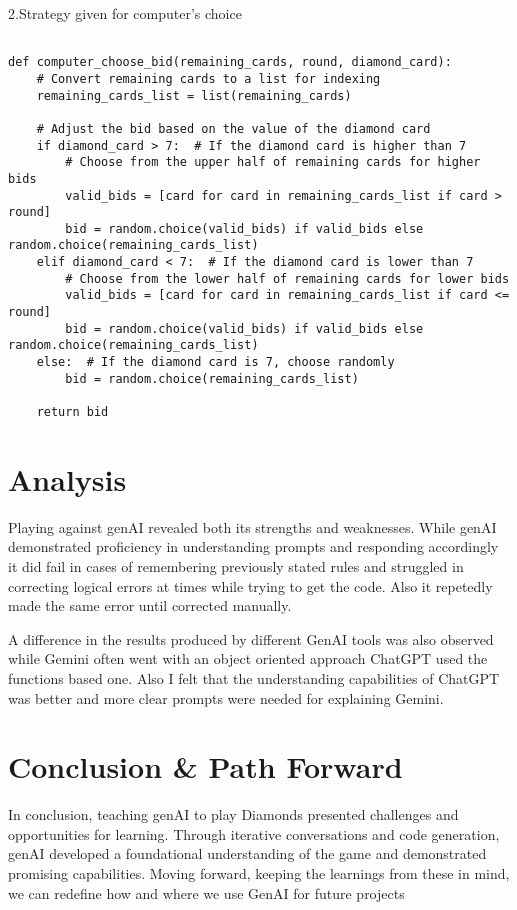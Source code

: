 \documentclass{article}
\begin{document}
2.Strategy given for computer's choice

\begin{lstlisting}

def computer_choose_bid(remaining_cards, round, diamond_card):
    # Convert remaining cards to a list for indexing
    remaining_cards_list = list(remaining_cards)
    
    # Adjust the bid based on the value of the diamond card
    if diamond_card > 7:  # If the diamond card is higher than 7
        # Choose from the upper half of remaining cards for higher bids
        valid_bids = [card for card in remaining_cards_list if card > round]
        bid = random.choice(valid_bids) if valid_bids else random.choice(remaining_cards_list)
    elif diamond_card < 7:  # If the diamond card is lower than 7
        # Choose from the lower half of remaining cards for lower bids
        valid_bids = [card for card in remaining_cards_list if card <= round]
        bid = random.choice(valid_bids) if valid_bids else random.choice(remaining_cards_list)
    else:  # If the diamond card is 7, choose randomly
        bid = random.choice(remaining_cards_list)
    
    return bid

\end{lstlisting}

\section{Analysis}
Playing against genAI revealed both its strengths and weaknesses. While genAI demonstrated proficiency in understanding prompts and responding accordingly it did fail in cases of remembering previously stated rules and struggled in correcting logical errors at times while trying to get the code. Also it repetedly made the same error until corrected manually.

A difference in the results produced by different GenAI tools was also observed while Gemini often went with an object oriented approach ChatGPT used the functions based one. Also I felt that the understanding capabilities of ChatGPT was better and more clear prompts were needed for explaining Gemini.

\section{Conclusion \& Path Forward}
In conclusion, teaching genAI to play Diamonds presented challenges and opportunities for learning. Through iterative conversations and code generation, genAI developed a foundational understanding of the game and demonstrated promising capabilities. Moving forward, keeping the learnings from these in mind, we can redefine how and where we use GenAI for future projects 
\end{document}
